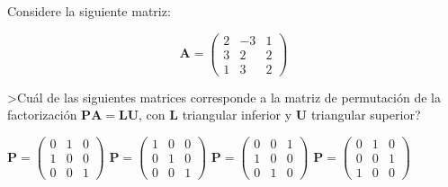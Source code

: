 \begin{pregunta}
\begin{cuerpo}
Considere la siguiente matriz:

$$\boldsymbol{A}=\left(
\begin{array}{rrr}
2&-3&1\\
3&2&2\\
1&3&2
\end{array}
\right)
$$

>Cu\'al de las siguientes matrices corresponde a la matriz de permutaci\'on de la factorizaci\'on $\boldsymbol{PA}=\boldsymbol{LU}$, con $\boldsymbol{L}$ triangular inferior y $\boldsymbol{U}$ triangular superior?
\end{cuerpo}
\begin{multicols}{2}
\begin{alternativas}
{$\displaystyle\boldsymbol{P}=\left(\begin{array}{rrr} 0&1&0\\ 1&0&0\\ 0&0&1 \end{array}\right)$}
{$\displaystyle\boldsymbol{P}=\left(\begin{array}{rrr} 1&0&0\\ 0&1&0\\ 0&0&1 \end{array}\right)$}
{$\displaystyle\boldsymbol{P}=\left(\begin{array}{rrr} 0&0&1\\ 1&0&0\\ 0&1&0 \end{array}\right)$}
{$\displaystyle\boldsymbol{P}=\left(\begin{array}{rrr} 0&1&0\\ 0&0&1\\ 1&0&0 \end{array}\right)$}
\end{alternativas}
\end{multicols}
\justificacion{7cm}
\end{pregunta}